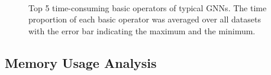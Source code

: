 \begin{figure}[H]
    \centering
    \\
    \caption{Top 5 time-consuming basic operators of typical GNNs. The time proportion of each basic operator was averaged over all datasets with the error bar indicating the maximum and the minimum.}
    \label{fig:exp_inference_top_basic_ops}
\end{figure}

\subsection{Memory Usage Analysis}
\label{sec:memory_usage_analysis}

